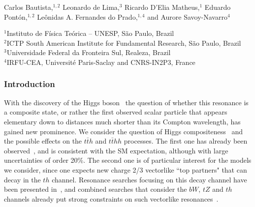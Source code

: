\medskip
\begin{center}
{Carlos Bautista,$^{1,2}$ Leonardo de Lima,$^3$ Ricardo D'Elia Matheus,$^1$ Eduardo Pont\'on,$^{1,2}$ Le\^onidas A. Fernandes do Prado,$^{1,4}$ and Aurore Savoy-Navarro$^4$}

{\small 
$^1$Instituto de F\'isica Te\'orica -- UNESP, S\~ao Paulo, Brazil \\
$^2$ICTP South American Institute for Fundamental Research, S\~ao Paulo, Brazil \\
$^3$Universidade Federal da Fronteira Sul, Realeza, Brazil \\
$^4$IRFU-CEA, Universit\'e Paris-Saclay and CNRS-IN2P3, France}
\end{center}
\label{sec9:MCHMtthh}
\subsubsection{Introduction}

With the discovery of the Higgs boson~\cite{Aad:2012tfa,
CMSHiggsJuly2012} the question of whether this resonance is a
composite state, or rather the first observed scalar particle that
appears elementary down to distances much shorter than its Compton
wavelength, has gained new prominence.  We consider the question of
Higgs compositeness~\cite{Kaplan:1983fs, Kaplan:1983sm, Georgi:1984ef, Georgi:1984af, Dugan:1984hq} and the possible effects on the $t\bar{t}h$ and
$t\bar{t}  h h$ processes.  The first one has already been
observed~\cite{Aaboud:2018urx, Sirunyan:2018hoz}, and is consistent
with the SM expectation, although with large uncertainties of order
20\%.  The second one is of particular interest for the models we
consider, since one expects new charge 2/3 vectorlike ``top partners"
that can decay in the $th$ channel.  Resonance searches focusing on
this decay channel have been presented in~\cite{Aaboud:2018xuw}, and
combined searches that consider the $bW$, $tZ$ and $th$ channels
already put strong constraints on such vectorlike
resonances~\cite{Aaboud:2018pii, Sirunyan:2018omb}.

